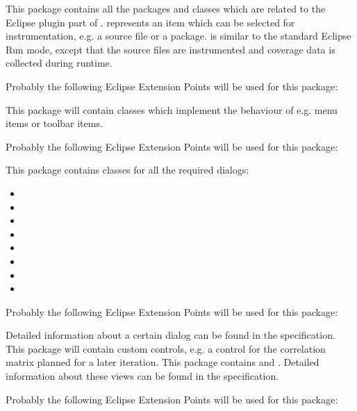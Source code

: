 This package contains all the packages and classes which are related to the Eclipse plugin part of \gbt.
 represents an item which can be selected for instrumentation, e.g. a source file or a package.  is similar to the standard Eclipse Run mode, except that the source files are instrumented and coverage data is collected during runtime.

Probably the following Eclipse Extension Points will be used for this package:
\begin{itemize}
\end{itemize}


This package will contain classes which implement the behaviour of e.g. menu items or toolbar items.

Probably the following Eclipse Extension Points will be used for this package:
\begin{itemize}
\end{itemize}

This package contains classes for all the required dialogs:
\begin{itemize}
\item {}
\item {}
\item {}
\item {}
\item {}
\item {}
\item {}
\item {}
\end{itemize}
Probably the following Eclipse Extension Points will be used for this package:
\begin{itemize}
\end{itemize}

Detailed information about a certain dialog can be found in the specification.
This package will contain custom controls, e.g. a control for the correlation matrix planned for a later iteration.
This package contains  and . Detailed information about these views can be found in the specification.

\par Probably the following Eclipse Extension Points will be used for this package:
\begin{itemize}
\end{itemize}
